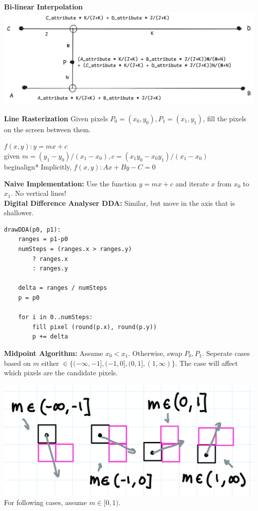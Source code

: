 \documentclass[letterpaper, 8pt]{extarticle}
\begin{document}
\begin{multicols*}{4}
\textbf{Bi-linear Interpolation}
\includegraphics[width=\linewidth]{bilinear-interpolation.png}

\textbf{Line Rasterization}
Given pixels $P_0 = (x_0, y_0), P_1 = (x_1, y_1)$, fill the pixels on the screen between them.

$f(x, y): y = mx + c$\\given $m=(y_1 - y_0)/(x_1 - x_0), c=(x_1y_0 - x_0y_1)/(x_1 - x_0)$\\begin{align*}
Implicitly, $f(x,y): Ax + By - C = 0$

\textbf{Naive Implementation:} Use the function $y=mx+c$ and iterate $x$ from $x_0$ to $x_1$. No vertical lines!\\
\textbf{Digital Difference Analyser DDA:} Similar, but move in the axis that is shallower.

\begin{lstlisting}
drawDDA(p0, p1):
    ranges = p1-p0
    numSteps = (ranges.x > ranges.y) 
        ? ranges.x
        : ranges.y

    delta = ranges / numSteps
    p = p0

    for i in 0..numSteps:
        fill pixel (round(p.x), round(p.y))
        p += delta
\end{lstlisting}

\textbf{Midpoint Algorithm:} Assume $x_0 < x_1$. Otherwise, swap $P_0, P_1$.
Seperate cases based on $m$ either $\in \{(-\infty, -1], (-1, 0],(0, 1], (1, \infty)\}$.
The case will affect which pixels are the candidate pixels.

\includegraphics[width=\linewidth]{rasterize-candidates.png}\\
For following cases, assume $m \in [0, 1)$.


\end{multicols*}
\end{document}
